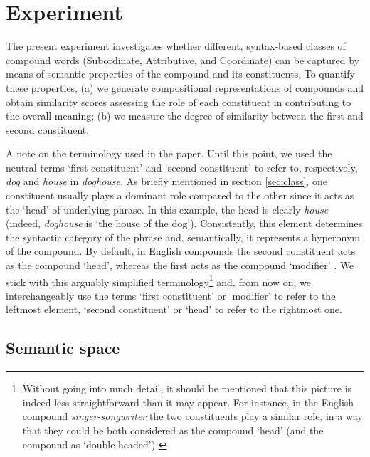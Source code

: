 \documentclass[output=paper]{langsci/langscibook}
\begin{document}

\section{Experiment}
\label{sec:experiments}

The present experiment investigates whether different, syntax-based classes of compound words (Subordinate, Attributive, and Coordinate) can be captured by means of semantic properties of the compound and its constituents. To quantify these properties, (a) we generate compositional representations of compounds and obtain similarity scores assessing the role of each constituent in contributing to the overall meaning; (b) we measure the degree of similarity between the first and second constituent.

A note on the terminology used in the paper. Until this point, we used the neutral terms `first constituent' and `second constituent' to refer to, respectively, \emph{dog} and \emph{house} in \emph{doghouse}. As briefly mentioned in section \ref{sec:class}, one constituent usually plays a dominant role compared to the other since it acts as the `head' of underlying phrase. In this example, the head is clearly \emph{house} (indeed, \emph{doghouse} is `the house of the dog'). Consistently, this element determines the syntactic category of the phrase and, semantically, it represents a hyperonym of the compound. By default, in English compounds the second constituent acts as the compound `head', whereas the first acts as the compound `modifier' \citep{bauerOHC}. We stick with this arguably simplified terminology\footnote{Without going into much detail, it should be mentioned that this picture is indeed less straightforward than it may appear. For instance, in the English compound \emph{singer-songwriter} the two constituents play a similar role, in a way that they could be both considered as the compound `head' (and the compound as `double-headed') \citep{bauerOHC}} and, from now on, we interchangeably use the terms `first constituent' or `modifier' to refer to the leftmost element, `second constituent' or `head' to refer to the rightmost one.


\subsection{Semantic space}\label{sec:vectors}
\end{document}

